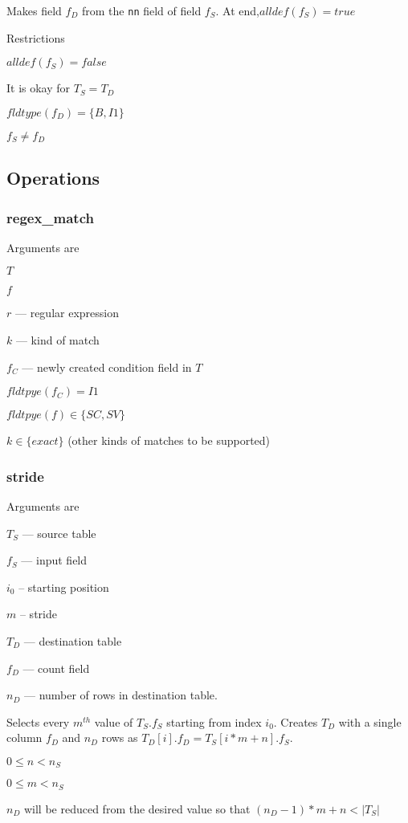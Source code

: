 \documentclass{report}
\begin{document}
Makes field \(f_D\) from the {\tt nn} field of field \(f_S\). At
end,\(alldef(f_S) = true\)

Restrictions
\be
\item \(alldef(f_S) = false\)
\item It is okay for \(T_S = T_D\)
\item \(fldtype(f_D) = \{B, I1\} \) 
\item \(f_S \neq f_D\)
\ee


\subsection{Operations}
\subsubsection{regex\_match}
\label{regex_match}

Arguments are
\be
\item \(T\)
\item \(f\)
\item \(r\) --- regular expression
\item \(k\) --- kind of match 
\item \(f_C\) --- newly created condition field in \(T\)
\ee 

\be
\item \(fldtpye(f_C) = I1\)
\item \(fldtpye(f) \in \{SC, SV\}\)
\item \(k \in \{exact\}\) (other kinds of matches to be supported)
\ee

\subsubsection{stride}
\label{stride}
Arguments are 
\be
\item \(T_S\) --- source table
\item \(f_S\) --- input field 
\item \(i_0\) --  starting position
\item \(m\)   --  stride
\item \(T_D\) --- destination table
\item \(f_D\) --- count field 
\item \(n_D\) --- number of rows in destination table.
\ee

Selects every \(m^{th}\) value of \(T_S.f_S\) starting from index \(i_0\).
Creates \(T_D\) with a single column \(f_D\) and \(n_D\) rows as
\(T_D[i].f_D = T_S[i*m + n].f_S\).
\bi
\item \(0 \leq n < n_S\)
\item \(0 \leq m < n_S\)
\item 
\(n_D\) will be reduced from the desired value so that
\((n_D-1)*m + n < |T_S|\)
\ei
\end{document}
